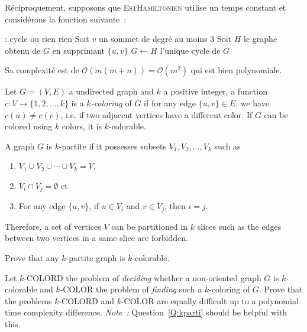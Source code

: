 \documentclass[12pt,addpoints]{exam}
\newcommand{\bigo}{\mathcal{O}}
\begin{document}
\begin{questions}
\begin{solution}
Réciproquement, supposons que \textsc{EstHamiltonien} utilise un temps constant et considérons la fonction suivante~:
\begin{algorithmic}[1]
   : cycle ou rien
      \State \Return rien
    \Else
        \State Soit $v$ un sommet de degré au moins $3$
          \State Soit $H$ le graphe obtenu de $G$ en supprimant $\{u,v\}$
            \State $G \leftarrow H$
          \EndIf
        \EndFor
      \EndWhile
      \State \Return l'unique cycle de $G$
    \EndIf
  \EndFunction
\end{algorithmic}
Sa complexité est de $\bigo(m(m + n)) = \bigo(m^2)$ qui est bien polynomiale.
\end{solution}

\question\label{Q:kparti}
Let $G = (V,E)$ a undirected graph and $k$ a positive integer, a function $c : V \rightarrow \{1,2,\ldots,k\}$ is a \emph{$k$-coloring} of $G$ if for any edge $\{u,v\} \in E$, we have $c(u) \neq c(v)$, i.e. if two adjacent vertices have a different color. If $G$ can be colored using $k$ colors, it is $k$-colorable.

A graph $G$ is $k$-partite if it possesses subsets $V_1, V_2, \ldots, V_k$ such as
\begin{enumerate}
  \item $V_1 \cup V_2 \cup \cdots \cup V_k = V$,
  \item $V_i \cap V_j = \emptyset$ et
  \item For any edge $\{u,v\}$, if $u \in V_i$ and $v \in V_j$, then $i = j$.
\end{enumerate}
Therefore, a set of vertices $V$ can be partitioned in $k$ slices such as the edges between two vertices in a same slice are forbidden.

Prove that any $k$-partite graph is $k$-colorable.

\question
Let $k$-COLORD the problem of \emph{deciding} whether a non-oriented graph $G$ is $k$-colorable and $k$-COLOR the problem of \emph{finding} such a $k$-coloring of $G$.
Prove that the problems $k$-COLORD and $k$-COLOR are equally difficult up to a polynomial time complexity difference. \emph{Note~:} Question~\ref{Q:kparti} should be helpful with this.



\end{questions}
\end{document}

